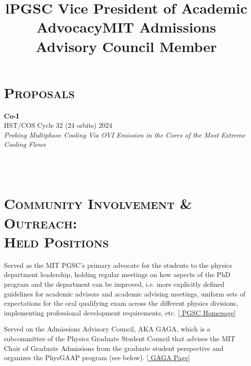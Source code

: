 \documentclass[marg, centered]{res}
\begin{document}
\begin{resume}
\begin{etaremune}
\end{etaremune}


\section{{\scshape \bfseries Proposals}}
\textbf{Co-I} \\
HST/COS Cycle 32 (24 orbits) \hfill 2024 \\
\textit{Probing Multiphase Cooling Via OVI Emission in the Cores of the Most Extreme Cooling Flows}


\begin{format}
\title{l} \\
 \\
\body
\end{format}

\section{{\scshape \bfseries Community Involvement \& Outreach:\\ Held Positions}}

\title{\textbf{PGSC Vice President of Academic Advocacy}}
\begin{position}
Served as the MIT PGSC's primary advocate for the students to the physics department leadership, holding regular meetings on how aspects of the PhD program and the department can be improved, i.e. more explicitly defined guidelines for academic advisors and academic advising meetings, uniform sets of expectations for the oral qualifying exam across the different physics divisions, implementing professional development requirements, etc. [\href{https://physics-gsc.scripts.mit.edu/home/}{\color{dkbu} PGSC Homepage}]
\end{position}

\title{\textbf{MIT Admissions Advisory Council Member}}
\begin{position}
Served on the Admissions Advisory Council, AKA GAGA, which is a subcommittee of the Physics Graduate Student Council that advises the MIT Chair of Graduate Admissions from the graduate student perspective and organizes the PhysGAAP program (see below). [\href{https://physics-gsc.scripts.mit.edu/home/gaga/}{\color{dkbu} GAGA Page}]
\end{position}


\end{resume}
\end{document}
